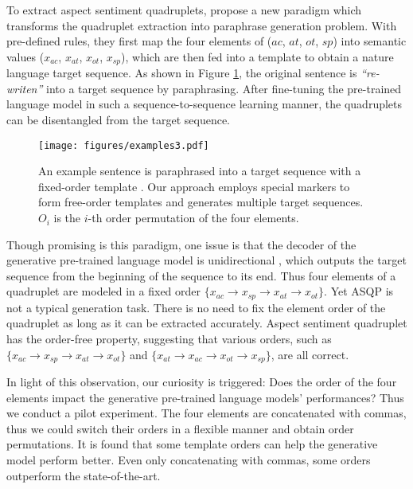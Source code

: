 \documentclass[11pt]{article}
\begin{document}
To extract aspect sentiment quadruplets, \citet{zhang-etal-2021-aspect-sentiment} propose a new paradigm which transforms the quadruplet extraction into paraphrase generation problem. With pre-defined rules, they first map the four elements of ($ac$, $at$, $ot$, $sp$) into semantic values ($x_{ac}$, $x_{at}$, $x_{ot}$, $x_{sp}$), which are then fed into a template to obtain a nature language target sequence. As shown in Figure \ref{fig:examples}, the original sentence is \emph{``re-writen''} into a target sequence by paraphrasing. After fine-tuning the pre-trained language model \cite{JMLR:v21:20-074} in such a sequence-to-sequence learning manner, the quadruplets can be disentangled from the target sequence.


\begin{figure}[t]
\centering
\texttt{[image: figures/examples3.pdf]} 
\caption{An example sentence is paraphrased into a target sequence with a fixed-order template \cite{zhang-etal-2021-aspect-sentiment}. Our approach employs special markers to form free-order templates and generates multiple target sequences. $O_i$ is the $i$-th order permutation of the four elements.}
\label{fig:examples}
\end{figure}

Though promising is this paradigm, one issue is that the decoder of the generative pre-trained language model \cite{JMLR:v21:20-074} is unidirectional \cite{vinyals2015order}, which outputs the target sequence from the beginning of the sequence to its end. Thus four elements of a quadruplet are modeled in a fixed order $\{x_{ac}\rightarrow{x_{sp}}\rightarrow{x_{at}}\rightarrow{x_{ot}}\}$. Yet ASQP is not a typical generation task. There is no need to fix the element order of the quadruplet as long as it can be extracted accurately. Aspect sentiment quadruplet has the order-free property, suggesting that various orders, such as $\{x_{ac}\rightarrow{x_{sp}}\rightarrow{x_{at}}\rightarrow{x_{ot}}\}$ and $\{x_{at}\rightarrow{x_{ac}}\rightarrow{x_{ot}}\rightarrow{x_{sp}}\}$, are all correct.


In light of this observation, our curiosity is triggered: Does the order of the four elements impact the generative pre-trained language models' performances? Thus we conduct a pilot experiment. The four elements are concatenated with commas, thus we could switch their orders in a flexible manner and obtain order permutations. It is found that some template orders can help the generative model perform better. Even only concatenating with commas, some orders outperform the state-of-the-art.  
\end{document}

